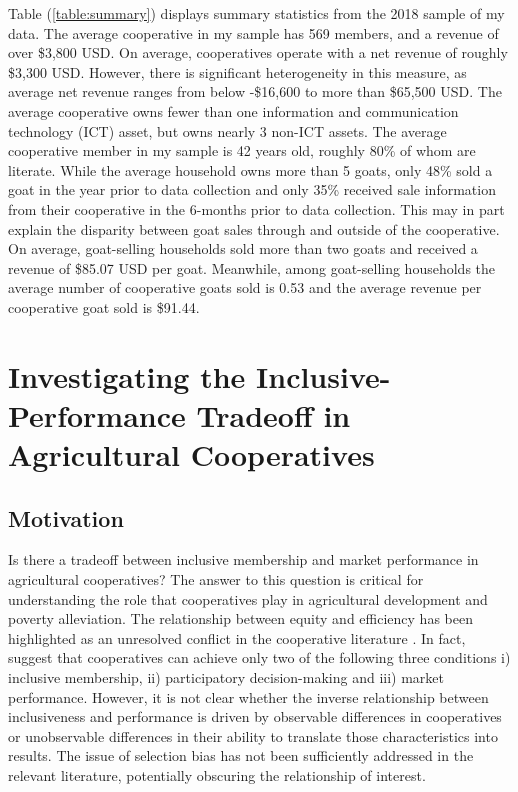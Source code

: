 \documentclass[11pt]{article}
\begin{document}
Table (\ref{table:summary}) displays summary statistics from the 2018 sample of my data. The average cooperative in my sample has 569 members, and a revenue of over \$3,800 USD. On average, cooperatives operate with a net revenue of roughly \$3,300 USD. However, there is significant heterogeneity in this measure, as average net revenue ranges from below -\$16,600 to more than \$65,500 USD. The average cooperative owns fewer than one information and communication technology (ICT) asset, but owns nearly 3 non-ICT assets. The average cooperative member in my sample is 42 years old, roughly 80\% of whom are literate. While the average household owns more than 5 goats, only 48\% sold a goat in the year prior to data collection and only 35\% received sale information from their cooperative in the 6-months prior to data collection. This may in part explain the disparity between goat sales through and outside of the cooperative. On average, goat-selling households sold more than two goats and received a revenue of \$85.07 USD per goat. Meanwhile, among goat-selling households the average number of cooperative goats sold is 0.53 and the average revenue per cooperative goat sold is \$91.44.


\newpage
\singlespacing
\section{Investigating the Inclusive-Performance Tradeoff in Agricultural Cooperatives} \label{sec:E1}
\doublespacing


\subsection{Motivation} \label{sec:E1_motivation}

Is there a tradeoff between inclusive membership and market performance in agricultural cooperatives? The answer to this question is critical for understanding the role that cooperatives play in agricultural development and poverty alleviation. 
The relationship between equity and efficiency has been highlighted as an unresolved conflict in the cooperative literature \citep{worldbank08}. In fact, \citet{bernard-spielman09} suggest that cooperatives can achieve only two of the following three conditions i) inclusive membership, ii) participatory decision-making and iii) market performance. However, it is not clear whether the inverse relationship between inclusiveness and performance is driven by observable differences in cooperatives or unobservable differences in their ability to translate those characteristics into results. The issue of selection bias has not been sufficiently addressed in the relevant literature, potentially obscuring the relationship of interest. 
\end{document}
